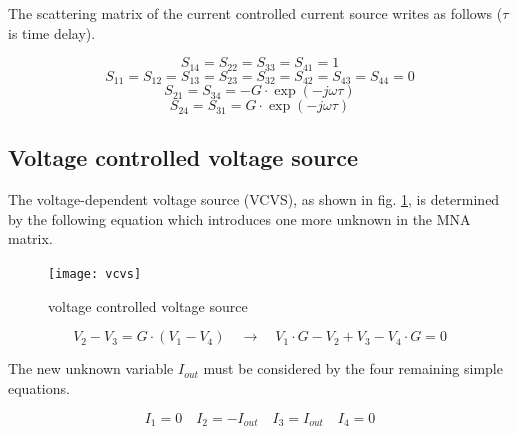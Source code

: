 The scattering matrix of the current controlled current source
writes as follows ($\tau$ is time delay).

\begin{equation}
S_{14} = S_{22} = S_{33} = S_{41} = 1
\end{equation}
\begin{equation}
S_{11} = S_{12} = S_{13} = S_{23} = S_{32} = S_{42} = S_{43} = S_{44} = 0
\end{equation}
\begin{equation}
S_{21} = S_{34} = -G\cdot \exp\left(-j\omega\tau\right)
\end{equation}
\begin{equation}
S_{24} = S_{31} = G\cdot \exp\left(-j\omega\tau\right)
\end{equation}


\subsection{Voltage controlled voltage source}
\label{sec:vcvs}

The voltage-dependent voltage source (VCVS), as shown in fig.
\ref{fig:vcvs}, is determined by the following equation which
introduces one more unknown in the MNA matrix.

\begin{figure}[ht]
\begin{center}
\texttt{[image: vcvs]}
\end{center}
\caption{voltage controlled voltage source}
\label{fig:vcvs}
\end{figure}
\FloatBarrier

\begin{equation}
V_{2} - V_{3} = G\cdot \left(V_{1} - V_{4}\right)
\quad \rightarrow \quad
V_{1}\cdot G - V_{2} + V_{3} - V_{4}\cdot G = 0
\label{eq:vcvs}
\end{equation}

The new unknown variable $I_{out}$ must be considered by the four
remaining simple equations.

\begin{equation}
I_{1} = 0 \quad I_{2} = -I_{out} \quad I_{3} = I_{out} \quad I_{4} = 0
\end{equation}


